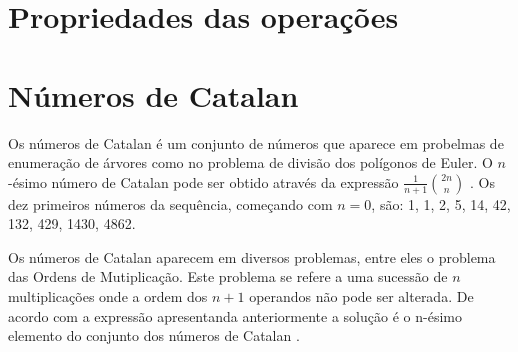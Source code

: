 \chapter{Propriedades das operações}

\chapter{Números de Catalan}
Os números de Catalan é um conjunto de números que aparece em probelmas de enumeração de árvores como no problema de divisão dos polígonos de Euler. O $n$-ésimo número de Catalan pode ser obtido através da expressão $\frac{1}{n+1} \binom{2n}{n} $ \cite{wolfram}. Os dez primeiros números da sequência, começando com $n = 0$, são: 1, 1, 2, 5, 14, 42, 132, 429, 1430, 4862.

Os números de Catalan aparecem em diversos problemas, entre eles o problema das Ordens de Mutiplicação.
Este problema se refere a uma sucessão de $n$ multiplicações onde a ordem dos $n+1$ operandos não pode ser alterada. De acordo com a expressão apresentanda anteriormente a solução é o n-ésimo elemento do conjunto dos números de Catalan \cite{catNum}.
